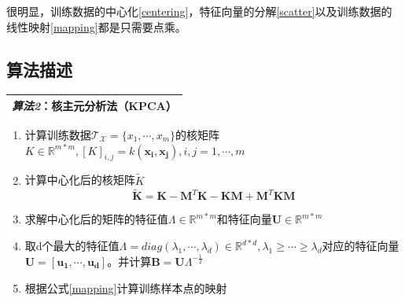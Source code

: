 \documentclass[12pt,a4paper,CJK]{beamer}
\begin{document}
\begin{CJK*}{UTF8}{gkai}
\begin{frame}{\subsecname}
很明显，训练数据的中心化\ref{centering}，特征向量的分解\ref{scatter}以及训练数据的线性映射\ref{mapping}都是只需要点乘。
\end{frame}


\subsection{算法描述}
\begin{frame}{\subsecname}
\begin{table}[!htp]
\label{notation}
\center
\begin{tabular}{|L{0.9\textwidth}|}
\hline
\textit{算法2}：核主元分析法（KPCA） \\
\hline
\end{tabular}
\end{table}
\begin{enumerate}
\item 计算训练数据$\mathcal{T_X}=\{x_1,\cdots,x_m\}$的核矩阵$K \in \mathbb{R}^{m*m},[K]_{i,j}=k(\boldsymbol{x_i},\boldsymbol{x_j}),i,j=1,\cdots,m$
\item 计算中心化后的核矩阵$\tilde{K}$
\begin{equation}
\tilde{\mathbf{K}}=\mathbf{K}-\mathbf{M}^T\mathbf{K}-\mathbf{K}\mathbf{M}
+\mathbf{M}^T\mathbf{K}\mathbf{M}
\end{equation}
\item 求解中心化后的矩阵的特征值$\Lambda \in \mathbb{R}^{m*m}$和特征向量$\mathbf{U} \in \mathbb{R}^{m*m}$
\item 取d个最大的特征值$\Lambda=diag(\lambda_1,\cdots,\lambda_d) \in \mathbb{R}^{d*d},\lambda_1\geqslant\cdots\geqslant\lambda_d$对应的特征向量$\mathbf{U}=[\boldsymbol{u_1},\cdots,\boldsymbol{u_d}]$。并计算$\mathbf{B}=\mathbf{U}\Lambda^{-\frac{1}{2}}$
\item 根据公式\ref{mapping}计算训练样本点的映射
\end{enumerate}

\end{frame}



\end{CJK*}
\end{document}
